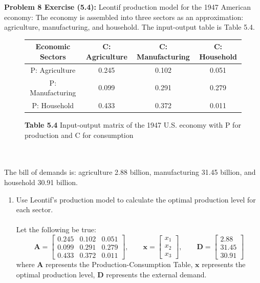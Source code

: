 \documentclass[11pt]{article}
\newenvironment{problem}[1]{\textbf{Problem #1: }}{\newpage}
\begin{document}
	\begin{problem}{8 Exercise (5.4)}
		Leontif production model for the 1947 American economy: The economy is assembled into three sectors as an approximation: agriculture, manufacturing, and household. The input-output table is Table 5.4.
		\begin{figure}[h!]
			\centering
			\captionsetup{labelformat=empty}
			\caption{\textbf{Table 5.4} Input-output matrix of the 1947 U.S. economy with P for production and C for
				consumption}
			\begin{tabular}{|c|c|c|c|}
				\hline
				Economic Sectors & C: Agriculture & C: Manufacturing & C: Household \\
				\hline
				P: Agriculture & 0.245 & 0.102 & 0.051 \\
				P: Manufacturing & 0.099 & 0.291 & 0.279 \\
				P: Household & 0.433 & 0.372 & 0.011 \\
				\hline
			\end{tabular}
		\end{figure}
		\\ \\
		The bill of demands is: agriculture 2.88 billion, manufacturing 31.45 billion, and household 30.91 billion.
		\begin{enumerate}[label = (\alph*)]
			\item  Use Leontif’s production model to calculate the optimal production level for each sector.
			\\ \\
			Let the following be true:
			\[\boldsymbol{A} = \begin{bmatrix}
				0.245 & 0.102 & 0.051 \\
				0.099 & 0.291 & 0.279 \\
				0.433 & 0.372 & 0.011 
			\end{bmatrix}, \qquad \boldsymbol{x} = \begin{bmatrix}
				x_1 \\ x_2 \\ x_3
			\end{bmatrix}, \qquad \boldsymbol{D} = \begin{bmatrix}
				2.88 \\ 31.45 \\ 30.91
			\end{bmatrix}\]
			where $\boldsymbol{A}$ represents the Production-Consumption Table, $\boldsymbol{x}$ represents the optimal production level, $\boldsymbol{D}$ represents the external demand.

\end{enumerate}
\end{problem}
\end{document}
